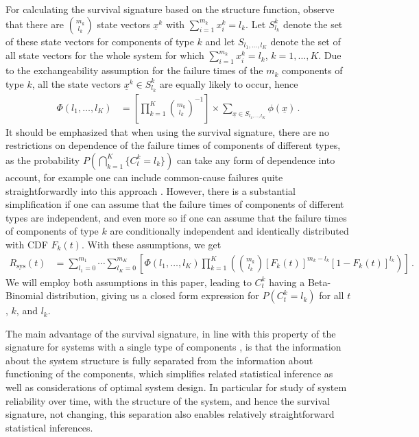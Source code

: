\documentclass[12pt, a4paper]{elsarticle}
\newcommand{\Rsys}{R_\text{sys}}
\def\Tsys{T_\text{sys}}
\begin{document}
For calculating the survival signature based on the structure function, observe that
there are $\binom{m_k}{l_k}$ state vectors $\underline{x}^k$ with $\sum_{i=1}^{m_k} x^k_i = l_k$. Let $S^k_{l_k}$ 
denote the set of these state vectors for components of type $k$ and let $S_{l_1,\ldots,l_K}$ denote the set of 
all state vectors for the whole system for which $\sum_{i=1}^{m_k} x^k_i = l_k$, $k=1,\ldots,K$. Due to the 
exchangeability assumption for the failure times of the $m_k$ components of type $k$, all the state vectors 
$\underline{x}^k \in S^k_{l_k}$ are equally likely to occur, hence \citep{2012:survsign}
\begin{align}
\label{eq:surv-sig}
\Phi(l_1,\ldots,l_K)
 &= \left[ \prod_{k=1}^K \binom{m_k}{l_k}^{-1} \right] \times \sum_{\underline{x} \in S_{l_1,\ldots,l_K}} \phi(\underline{x})\,.
\end{align}
%
It should be emphasized that when using the survival signature,
there are no restrictions on dependence of the failure times of components of different types,
as the probability $P(\bigcap_{k=1}^K \{C^k_t = l_k\})$ can take any form of dependence into account,
for example one can include common-cause failures quite straightforwardly into this approach \cite{CCM15}. %
However, there is a substantial simplification
if one can assume that the failure times of components of different types are independent,
and even more so if one can assume that the failure times of components of type $k$ 
are conditionally independent and identically distributed with CDF $F_k(t)$.
With these assumptions, we get
\begin{align*}
\Rsys(t) &= \sum_{l_1=0}^{m_1} \cdots \sum_{l_K=0}^{m_K} \left[ \Phi(l_1,\ldots,l_K)
            \prod_{k=1}^K \left( \binom{m_k}{l_k} [F_k(t)]^{m_k-l_k} [1-F_k(t)]^{l_k} \right) \right]\,.
\end{align*}
We will employ both assumptions in this paper,
leading to $C^k_t$ having a Beta-Binomial distribution,
giving us a closed form expression for $P(C^k_t = l_k)$ for all $t$, $k$, and $l_k$.

The main advantage of the survival signature, in line with this property of the signature for systems with a single type of 
components \citep{Sa07}, is that the information about the system structure is fully 
separated from the information about functioning of the components, which simplifies related statistical inference as well as
considerations of optimal system design. In particular for study of system reliability over time, with the structure of the system, 
and hence the survival signature, not changing, this separation also enables relatively straightforward statistical inferences. 
\end{document}
